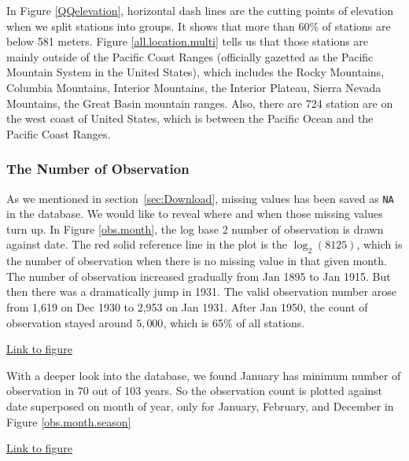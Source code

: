 In Figure \href{../plots/QQelevation.pdf}{\ref*{QQelevation}}, horizontal dash 
lines are the cutting points of elevation when we split stations into groups. 
It shows that more than
60\% of stations are below 581 meters. Figure 
\href{../plots/allstations.pdf}{\ref*{all.location.multi}} tells us that those 
stations are mainly outside of the 
Pacific Coast Ranges (officially gazetted as the Pacific Mountain System in the 
United States), which includes the Rocky Mountains, Columbia Mountains, Interior
Mountains, the Interior Plateau, Sierra Nevada Mountains, the Great Basin mountain 
ranges. Also, there are 724 station are on the west coast of United States, which
is between the Pacific Ocean and the Pacific Coast Ranges.

\subsubsection{The Number of Observation}

As we mentioned in section~\ref{sec:Download}, missing values has been saved as 
\texttt{NA} in the database. We would like to reveal where and when those 
missing values turn up.
In Figure \href{../plots/obs_month.pdf}{\ref*{obs.month}}, the log base 2 number
of observation is drawn against date. The red solid reference line in the plot is 
the $\log_2(8125)$, which is the number of observation when there is no missing 
value in that given month. The number of observation increased gradually from Jan
1895 to Jan 1915. But then there was a dramatically jump in 1931. The valid
observation number arose from 1,619 on Dec 1930 to 2,953 on Jan 1931. After Jan 
1950, the count of observation stayed around $5,000$, which is 65\% of all
stations. 

\begin{framed}
\begin{center}
  \href{../plots/obs_month.pdf}{Link to figure}
  \label{obs.month}
\end{center}
\end{framed}

With a deeper look into the database, we found January has minimum number of 
observation in 70 out of 103 years. So the observation count is plotted against
date superposed on month of year, only for January, February, and December in 
Figure \href{../plots/obs_month_byseason.pdf}{\ref*{obs.month.season}}

\begin{framed}
\begin{center}
  \href{../plots/obs_month_byseason.pdf}{Link to figure}
  \label{obs.month.season}
\end{center}
\end{framed}

